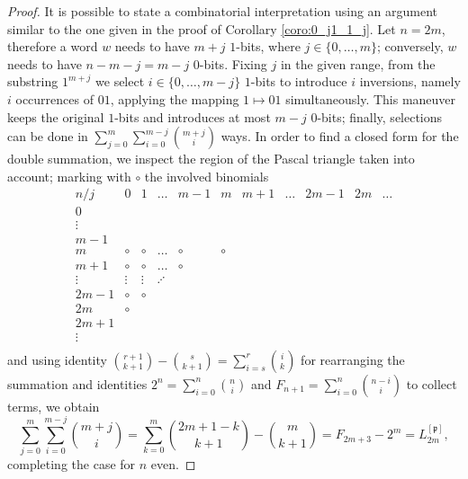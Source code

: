 \begin{proof}
It is possible to state a combinatorial interpretation using an argument
similar to the one given in the proof of Corollary \ref{coro:0_j1_1_j}.
Let $n=2m$, therefore a word $w$ needs to have $m+j$ $1$-bits, where $j\in
\lbrace 0,\ldots,m \rbrace$; conversely, $w$ needs to have $n-m-j=m-j$ $0$-bits.
Fixing $j$ in the given range, from the substring $1^{m+j}$ we select $i\in
\lbrace 0,\ldots,m-j \rbrace$ $1$-bits  to introduce $i$ inversions, namely $i$
occurrences of $01$, applying the mapping $1\mapsto 01$ simultaneously.  This
maneuver keeps the original $1$-bits  and introduces at most $m-j$ $0$-bits;
finally, selections can be done in $\sum_{j=0}^{m}{\sum_{i=0}^{m-j}{
{{m+j}\choose{i}}} } $ ways. In order to find a closed form for the double
summation, we inspect the region of the Pascal triangle taken into account;
marking with $\circ$ the involved binomials
\begin{displaymath}
\begin{array}{c|cccccccccc}
n/j     & 0 & 1 & \ldots & m-1 & m & m+1 & \ldots & 2m-1 & 2m &  \ldots\\
\hline
0       & \\
\vdots  & \\
m-1     & \\
m       & \circ & \circ & \ldots & \circ & \circ \\
m+1     & \circ & \circ & \ldots & \circ \\
\vdots  & \vdots & \vdots & \iddots \\
2m-1    & \circ & \circ \\
2m      & \circ \\
2m+1    & \\
\vdots  & \\
\end{array}
\end{displaymath}
and using identity ${ {r+1}\choose{k+1} }-{ {s}\choose{k+1} } = \sum_{i=s}^{r}{{ {i}\choose{k} }}$ for rearranging the summation and identities
$2^{n}=\sum_{i=0}^{n}{{ {n}\choose{i} }}$ and
$F_{n+1}=\sum_{i=0}^{n}{{ {n-i}\choose{i} }}$ to collect terms, we obtain
\begin{displaymath}
    \sum_{j=0}^{m}{\sum_{i=0}^{m-j}{ {{m+j}\choose{i}}} }
    = \sum_{k=0}^{m}{{ {2m+1-k}\choose{k+1} }-{ {m}\choose{k+1} }}
    = F_{2m+3}-2^{m} = L_{2m}^{[\mathfrak{p}]},
\end{displaymath}
completing the case for $n$ even.


\end{proof}
